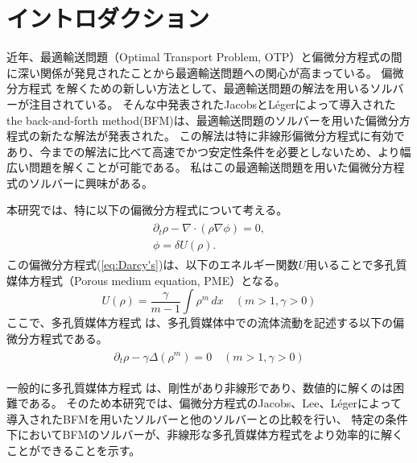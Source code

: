 \chapter{イントロダクション} \label{ch:intro}

近年、最適輸送問題（Optimal Transport Problem, OTP）と偏微分方程式の間に深い関係が発見されたことから最適輸送問題への関心が高まっている。
偏微分方程式 を解くための新しい方法として、最適輸送問題の解法を用いるソルバーが注目されている。
そんな中発表されたJacobsとLégerによって導入された the back-and-forth method(BFM)は、最適輸送問題のソルバーを用いた偏微分方程式の新たな解法が発表された。\cite{MR4238775}
この解法は特に非線形偏微分方程式に有効であり、今までの解法に比べて高速でかつ安定性条件を必要としないため、より幅広い問題を解くことが可能である。
私はこの最適輸送問題を用いた偏微分方程式のソルバーに興味がある。

本研究では、特に以下の偏微分方程式について考える。
\begin{align}
    \begin{split}
        \label{eq:Darcy's}
        \partial_t \rho - \nabla \cdot (\rho \nabla \phi) = 0, \\
        \phi = \delta U(\rho).
    \end{split}
\end{align}
この偏微分方程式(\ref{eq:Darcy's})は、以下のエネルギー関数$U$用いることで多孔質媒体方程式（Porous medium equation, PME）となる。
$$
    U(\rho) = \frac{\gamma}{m - 1} \int \rho^m \,dx \quad(m > 1, \gamma > 0)
$$
ここで、多孔質媒体方程式 は、多孔質媒体中での流体流動を記述する以下の偏微分方程式である。
\begin{align}
    \begin{split}
        \label{eq:PME}
        \partial_t \rho - \gamma\Delta(\rho^m) = 0  \quad(m > 1, \gamma > 0)
    \end{split}
\end{align}

一般的に多孔質媒体方程式 は、剛性があり非線形であり、数値的に解くのは困難である。
そのため本研究では、偏微分方程式のJacobs、Lee、Légerによって導入されたBFMを用いたソルバーと他のソルバーとの比較を行い、
特定の条件下においてBFMのソルバーが、非線形な多孔質媒体方程式をより効率的に解くことができることを示す。


